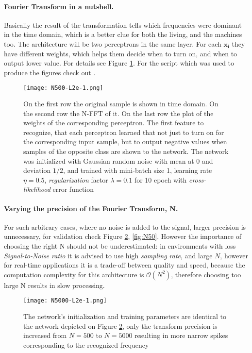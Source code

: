\paragraph{Fourier Transform in a nutshell.} Basically the result of the transformation tells which frequencies were dominant in the time domain, which is a better clue for both the living, and the machines too. 
The architecture will be two perceptrons in the same layer. 
For each $\mathbf{x_i}$ they have different weights, which helps them decide when to turn on, and when to output lower value. 
For details see Figure \ref{fig:N500}. 
For the script which was used to produce the figures check out \cite{DV}.

\begin{figure}
	\centering
	\texttt{[image: N500-L2e-1.png]}
	\caption{On the first row the original sample is shown in time domain.
	 On the second row the N-FFT of it. On the last row the plot of the 
	 weights of the corresponding perceptron. 
	 The first feature to 
	 recognize, that each perceptron learned that not just to turn on for 
	 the corresponding input sample, but to output negative values when 
	 samples of the opposite class are shown to the network. 
	 The network 
	 was initialized with Gaussian random noise with mean at 0 and 
	 deviation $1/2$, and trained with mini-batch size 1, learning rate $
	 \eta=0.5$, \emph{regularization} factor $\lambda=0.1$ for 10 epoch 
	 with \emph{cross-likelihood} error function}
	
	\label{fig:N500}
\end{figure}

\paragraph{Varying the precision of the Fourier Transform, N.}
For such arbitrary cases, where no noise is added to the signal, larger precision is unnecessary, for validation check Figure \ref{fig:N5000}, \ref{fig:N50}. However the importance of choosing the right N should not be underestimated: in environments with loss \emph{Signal-to-Noise ratio} it is advised to use high \emph{sampling rate}, and large $N$, however for real-time applications it is a trade-off between quality and speed, because the computation complexity for this architecture is $\mathcal{O}(N^2)$, therefore choosing too large N results in slow processing.

\begin{figure}
	\centering
	\texttt{[image: N5000-L2e-1.png]}
	\caption{The network's initialization and training parameters are identical to the network depicted on Figure \ref{fig:N5000}, only the transform precision is increased from $N=500$ to $N=5000$ resulting in more narrow spikes corresponding to the recognized frequency}
	
	\label{fig:N5000}
\end{figure}


